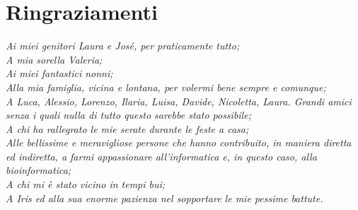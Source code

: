 \chapter*{\centering Ringraziamenti}
\begin{flushright}
    \textit{
        Ai miei genitori Laura e José, per praticamente tutto; \\
        A mia sorella Valeria; \\
        Ai miei fantastici nonni; \\
        Alla mia famiglia, vicina e lontana, per volermi bene sempre e comunque; \\
        A Luca, Alessio, Lorenzo, Ilaria, Luisa, Davide, Nicoletta, Laura. Grandi amici senza i quali nulla di tutto questo sarebbe stato possibile; \\
        A chi ha rallegrato le mie serate durante le feste a casa; \\
        Alle bellissime e meravigliose persone che hanno contribuito, in maniera diretta ed indiretta, a farmi appassionare all'informatica e, in questo caso, alla bioinformatica; \\
        A chi mi è stato vicino in tempi bui; \\
        A Iris ed alla sua enorme pazienza nel sopportare le mie pessime battute.
    }
\end{flushright}

 \null
